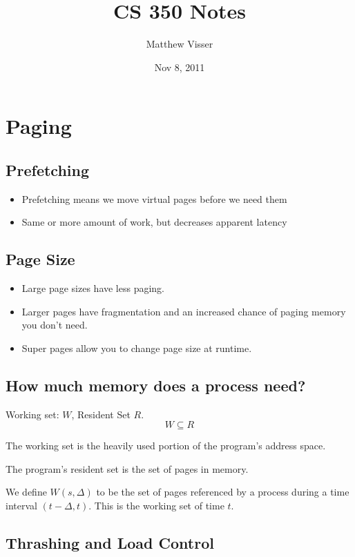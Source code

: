 \documentclass[12pt]{article}
\begin{document}
\title{CS 350 Notes}
\author{Matthew Visser}
\date{Nov  8, 2011}
\maketitle

\section{Paging}

\subsection{Prefetching}

\begin{itemize}
	\item Prefetching means we move virtual pages before we need them
	\item Same or more amount of work, but decreases apparent latency
\end{itemize}

\subsection{Page Size}

\begin{itemize}
	\item Large page sizes have less paging.
	\item Larger pages have fragmentation and an increased chance of paging
		memory you don't need.
	\item Super pages allow you to change page size at runtime.
\end{itemize}

\subsection{How much memory does a process need?}

Working set: $W$, Resident Set $R$.
\[ W \subseteq R \]

The working set is the heavily used portion of the program's address space.

The program's resident set is the set of pages in memory.

We define $W(s,\Delta)$ to be the set of pages referenced by a process during a
time interval $(t-\Delta,t)$. This is the working set of time $t$.

\subsection{Thrashing and Load Control}
\end{document}
